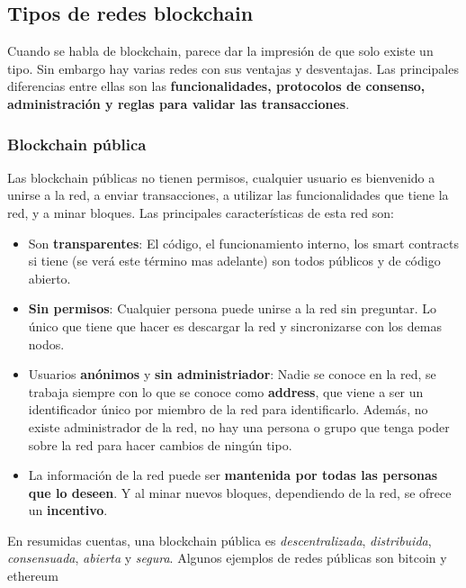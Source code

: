 \subsection{Tipos de redes blockchain}

Cuando se habla de blockchain, parece dar la impresión de que solo existe un tipo. Sin embargo hay varias redes con sus ventajas y desventajas\cite{tiposBlock1}\cite{tiposBlock2}. Las principales diferencias entre ellas son las \textbf{funcionalidades, protocolos de consenso, administración y reglas para validar las transacciones}.

\subsubsection{Blockchain pública}

Las blockchain públicas no tienen permisos, cualquier usuario es bienvenido a unirse a la red, a enviar transacciones, a utilizar las funcionalidades que tiene la red, y a minar bloques. Las principales características de esta red son:
\begin{itemize}
\item Son \textbf{transparentes}: El código, el funcionamiento interno, los smart contracts si tiene (se verá este término mas adelante) son todos públicos y de código abierto.
\item \textbf{Sin permisos}: Cualquier persona puede unirse a la red sin preguntar. Lo único que tiene que hacer es descargar la red y sincronizarse con los demas nodos.
\item Usuarios \textbf{anónimos} y \textbf{sin administriador}: Nadie se conoce en la red, se trabaja siempre con lo que se conoce como \textbf{address}, que viene a ser un identificador único por miembro de la red para identificarlo. Además, no existe administrador de la red, no hay una persona o grupo que tenga poder sobre la red para hacer cambios de ningún tipo.
\item La información de la red puede ser \textbf{mantenida por todas las personas que lo deseen}. Y al minar nuevos bloques, dependiendo de la red, se ofrece un \textbf{incentivo}.
\end{itemize}

En resumidas cuentas, una blockchain pública es \emph{descentralizada}, \emph{distribuida}, \emph{consensuada}, \emph{abierta} y \emph{segura}. Algunos ejemplos de redes públicas son bitcoin\cite{webBitcoin} y ethereum\cite{webEthereum}

